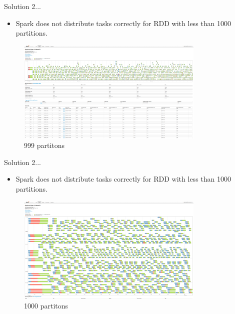 \documentclass{beamer}
\begin{document}
\begin{frame}{Solution 2...}
    \begin{itemize}
        \item Spark does not distribute tasks correctly for RDD with less than 1000 partitions.
    \end{itemize}

    \begin{figure}
        \includegraphics[width=0.8\textwidth]{figures/P999S3}
        \caption{999 partitons}
    \end{figure}
\end{frame}
\begin{frame}{Solution 2...}
    \begin{itemize}
        \item Spark does not distribute tasks correctly for RDD with less than 1000 partitions.
    \end{itemize}

    \begin{figure}
        \includegraphics[width=0.8\textwidth]{figures/P1000S3}
        \caption{1000 partitons}
    \end{figure}
\end{frame}
\end{document}
